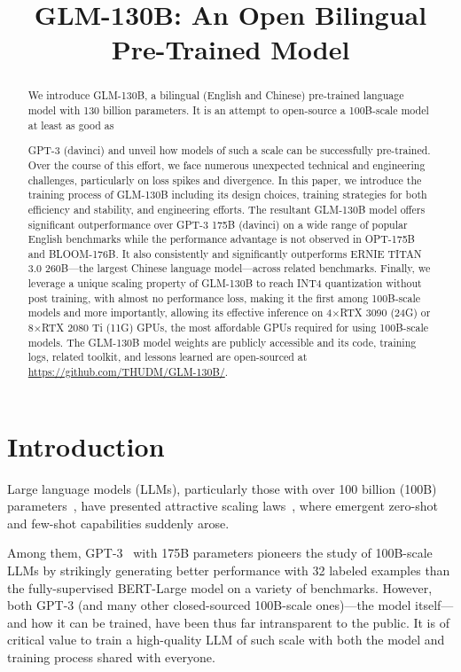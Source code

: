 \title{GLM-130B: An Open Bilingual Pre-Trained Model}

\begin{abstract}
We introduce GLM-130B, a bilingual (English and Chinese) pre-trained language model with 130 billion parameters. It is an attempt to open-source a 100B-scale model at least as good as 

GPT-3 (davinci) and unveil how models of such a scale can be successfully pre-trained. Over the course of this effort, we face numerous unexpected technical and engineering challenges, particularly on loss spikes and divergence. In this paper, we introduce the training process of GLM-130B including its design choices, training strategies for both efficiency and stability, and engineering efforts. The resultant GLM-130B model offers significant outperformance over GPT-3 175B (davinci) on a wide range of popular English benchmarks while the performance advantage is not observed in OPT-175B and BLOOM-176B. It also consistently and significantly outperforms ERNIE TITAN 3.0 260B---the largest Chinese language model---across related benchmarks. Finally, we leverage a unique scaling property of GLM-130B to reach INT4 quantization without post training, with almost no performance loss, making it the first among 100B-scale models and more importantly, allowing its effective inference on 4$\times$RTX 3090 (24G) or 8$\times$RTX 2080 Ti (11G) GPUs, the most affordable GPUs required for using 100B-scale models. The GLM-130B model weights are publicly accessible and its code, training logs, related toolkit, and lessons learned are open-sourced at \url{https://github.com/THUDM/GLM-130B/}.
\end{abstract}

\section{Introduction}
Large language models (LLMs), particularly those with over 100 billion (100B) parameters~\citep{brown2020language,thoppilan2022lamda,rae2021scaling,chowdhery2022palm,wang2021ernie}, have presented attractive scaling laws~\citep{wei2022emergent}, where emergent zero-shot and few-shot capabilities suddenly arose.

Among them, GPT-3~\citep{brown2020language} with 175B parameters pioneers the study of 100B-scale LLMs by strikingly generating better performance with 32 labeled examples than the fully-supervised BERT-Large model on a variety of benchmarks. However, both GPT-3 (and many other closed-sourced 100B-scale ones)---the model itself---and how it can be trained, have been thus far intransparent to the public. It is of critical value to train a high-quality LLM of such scale with both the model and training process shared with everyone.  

